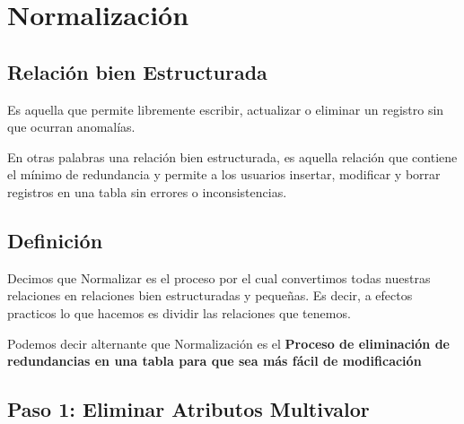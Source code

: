 \documentclass[12pt, fleqn]{report}                             %
\begin{document}
        \clearpage
        \section{Normalización}


            \subsection{Relación bien Estructurada}

                Es aquella que permite libremente escribir, actualizar o eliminar un registro
                sin que ocurran anomalías.

                En otras palabras una relación bien estructurada, es aquella relación que
                contiene el mínimo de redundancia y permite a los usuarios insertar, modificar
                y borrar registros en una tabla sin errores o inconsistencias.


            \subsection{Definición}

                Decimos que Normalizar es el proceso por el cual convertimos todas nuestras relaciones
                en relaciones bien estructuradas y pequeñas.
                Es decir, a efectos practicos lo que hacemos es dividir las relaciones que tenemos.


                Podemos decir alternante que Normalización es el \textbf{Proceso de eliminación de
                redundancias en una tabla para que sea más fácil de modificación}



            \clearpage
            \subsection{Paso 1: Eliminar Atributos Multivalor}
\end{document}

